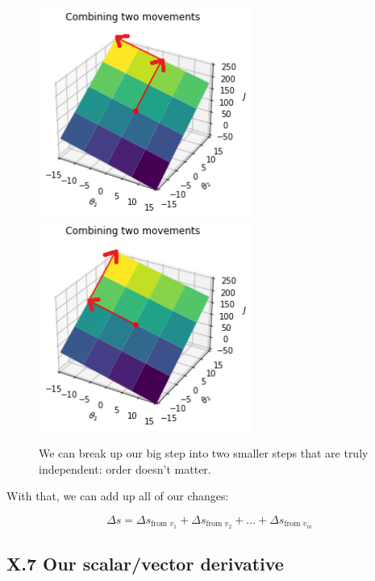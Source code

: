         \begin{figure}[H]
            \includegraphics[width=70mm,scale=0.5]{images/gradient_descent_images/thetaboth_movement_plane.png}
            \includegraphics[width=70mm,scale=0.5]{images/gradient_descent_images/thetaboth_movement_plane_reversed.png}
                
            \caption*{We can break up our big step into two smaller steps that are truly independent: order doesn't matter.}
        \end{figure}
        
        
        
        With that, we can add up all of our changes:
        
        \begin{equation}
            \Delta s = 
            \Delta s_{\text{from } v_1}
            +
            \Delta s_{\text{from } v_2}
            +
            \dots
            +
            \Delta s_{\text{from } v_m}
        \end{equation}
    
    \secdiv
    
    \subsection*{X.7 \quad Our scalar/vector derivative}
        

